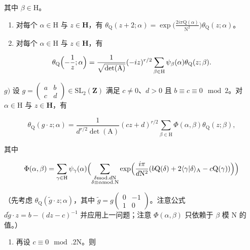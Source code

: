 其中 \(\beta\in\mathrm{H}\)。

\begin{enumerate}
\def\labelenumi{\alph{enumi})}
\setcounter{enumi}{4}
\item
  对每个 \(\alpha \in \mathrm{H}\) 与 \(z\in \mathbf{H}\)，有 \(\theta_{\mathrm{Q}}(z + 2;\alpha) = \exp \bigl (\frac{2i\pi\mathrm{Q}(\alpha)}{\mathrm{N}^2}\bigr)\theta_{\mathrm{Q}}(z;\alpha)\)。
\item
  对每个 \(\alpha \in \mathrm{H}\) 与 \(z\in \mathbf{H}\)，有
\end{enumerate}

\[
\theta_ {\mathrm{Q}} \Bigl (- \frac {1}{z}; \alpha \Bigr) = \frac {1}{\sqrt {\det (\mathrm{A})}} (- i z) ^ {r / 2} \sum_ {\beta \in \mathrm{H}} \psi_ {\beta} (\alpha) \theta_ {\mathrm{Q}} (z; \beta).
\]

\(g)\) 设 \(g = \begin{pmatrix} a & b \\ c & d \end{pmatrix} \in \mathrm{SL}_2(\mathbf{Z})\) 满足 \(c \neq 0\)、\(d > 0\) 且 \(b \equiv c \equiv 0 \mod 2\)。对 \(\alpha \in \mathrm{H}\) 与 \(z \in \mathbf{H}\)，有

\[
\theta_ {\mathrm{Q}} (g \cdot z; \alpha) = \frac {1}{d ^ {r / 2} \det (\mathrm{A})} (c z + d) ^ {r / 2} \sum_ {\beta \in \mathrm{H}} \Phi (\alpha , \beta) \theta_ {\mathrm{Q}} (z; \beta),
\]

其中

\[
\Phi (\alpha ,\beta) = \sum_{\gamma \in \mathrm{H}}\psi_{\gamma}(\alpha)\Bigl (\sum_{\substack{\delta \text{mod.} d\mathrm{N}\\ \delta \equiv \alpha \text{mod.}\mathrm{N}}}\exp \Bigl (\frac{i\pi}{d\mathrm{N}^{2}} (b\mathrm{Q}(\delta) + 2\langle \gamma |\delta \rangle_{\mathrm{A}} - c\mathrm{Q}(\gamma))\Bigr)\Bigr)
\]

（先考虑 \(\theta_{\mathrm{Q}}(\widetilde{g} \cdot z; \alpha)\)，其中 \(\widetilde{g} = g\begin{pmatrix} 0 & -1 \\ 1 & 0 \end{pmatrix}\)。注意公式 \(d\widetilde{g} \cdot z = b - (dz - c)^{-1}\) 并应用上一问题；注意 \(\Phi(\alpha, \beta)\) 只依赖于 \(\beta\) 模 N 的值。）

\begin{enumerate}
\def\labelenumi{\alph{enumi})}
\setcounter{enumi}{7}
\tightlist
\item
  再设 \(c \equiv 0 \mod. 2\mathrm{N}\)。则
\end{enumerate}

